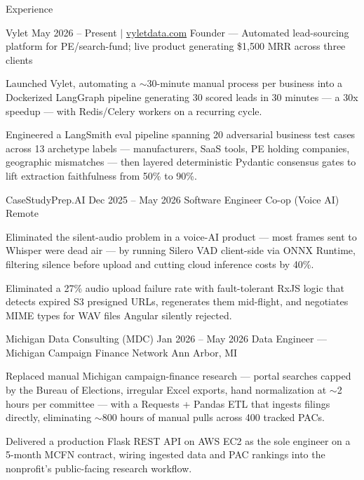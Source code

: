 \documentclass[
	11pt
]{../../../template}
\begin{document}
	\begin{rSection}{E}{xperience}
		\begin{rSectionEntry}
			{Vylet}
			{May 2026 -- Present $\vert$ \href{https://vyletdata.com}{vyletdata.com}}
			{Founder --- Automated lead-sourcing platform for PE/search-fund; live product generating \$1,500 MRR across three clients}
			{}
			{}

			\item Launched Vylet, automating a $\sim$30-minute manual process per business into a Dockerized LangGraph pipeline generating 30 scored leads in 30 minutes --- a 30x speedup --- with Redis/Celery workers on a recurring cycle.
			\item Engineered a LangSmith eval pipeline spanning 20 adversarial business test cases across 13 archetype labels --- manufacturers, SaaS tools, PE holding companies, geographic mismatches --- then layered deterministic Pydantic consensus gates to lift extraction faithfulness from 50\% to 90\%.
		\end{rSectionEntry}

		\begin{rSectionEntry}
			{CaseStudyPrep.AI}
			{Dec 2025 -- May 2026}
			{Software Engineer Co-op (Voice AI)}
			{}
			{Remote}

			\item Eliminated the silent-audio problem in a voice-AI product --- most frames sent to Whisper were dead air --- by running Silero VAD client-side via ONNX Runtime, filtering silence before upload and cutting cloud inference costs by 40\%.
			\item Eliminated a 27\% audio upload failure rate with fault-tolerant RxJS logic that detects expired S3 presigned URLs, regenerates them mid-flight, and negotiates MIME types for WAV files Angular silently rejected.
		\end{rSectionEntry}

		\begin{rSectionEntry}
			{Michigan Data Consulting (MDC)}
			{Jan 2026 -- May 2026}
			{Data Engineer --- Michigan Campaign Finance Network}
			{}
			{Ann Arbor, MI}

			\item Replaced manual Michigan campaign-finance research --- portal searches capped by the Bureau of Elections, irregular Excel exports, hand normalization at $\sim$2 hours per committee --- with a Requests + Pandas ETL that ingests filings directly, eliminating $\sim$800 hours of manual pulls across 400 tracked PACs.
			\item Delivered a production Flask REST API on AWS EC2 as the sole engineer on a 5-month MCFN contract, wiring ingested data and PAC rankings into the nonprofit's public-facing research workflow.
		\end{rSectionEntry}


\end{rSection}
\end{document}

